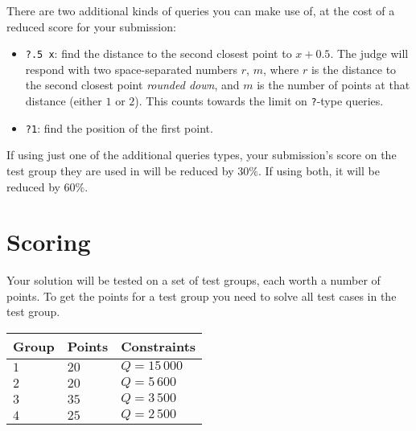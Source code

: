 There are two additional kinds of queries you can make use of, at the cost of a reduced score for your submission:

\begin{itemize}
  \item \texttt{?.5 x}: find the distance to the second closest point to $x + 0.5$.
    The judge will respond with two space-separated numbers $r$, $m$,
    where $r$ is the distance to the second closest point \emph{rounded down},
    and $m$ is the number of points at that distance (either $1$ or $2$).
    This counts towards the limit on \texttt{?}-type queries.
  \item \texttt{?1}: find the position of the first point.
\end{itemize}

If using just one of the additional queries types, your submission's score on the test group they are used in will be reduced by $30\%$.
If using both, it will be reduced by $60\%$.


\section*{Scoring}
Your solution will be tested on a set of test groups, each worth a number of points.
To get the points for a test group you need to solve all test cases in the test group.

\noindent
\begin{tabular}{| l | l | l |}
  \hline
  Group & Points & Constraints \\ \hline
  $1$   & $20$   & $Q = 15\,000$ \\ \hline
  $2$   & $20$   & $Q = 5\,600$ \\ \hline
  $3$   & $35$   & $Q = 3\,500$ \\ \hline
  $4$   & $25$   & $Q = 2\,500$ \\ \hline
\end{tabular}
